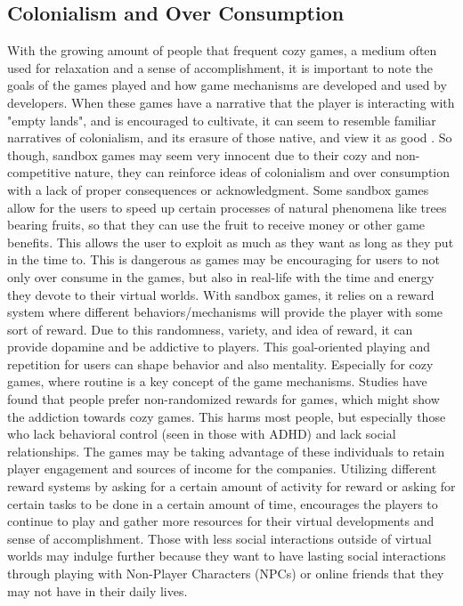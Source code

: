 \documentclass[10pt,twocolumn]{article}
\begin{document}
\subsection{Colonialism and Over Consumption}
With the growing amount of people that frequent cozy games, a medium often used for relaxation and a sense of accomplishment, it is important to note the goals of the games played and how game mechanisms are developed and used by developers. When these games have a narrative that the player is interacting with "empty lands", and is encouraged to cultivate, it can seem to resemble familiar narratives of colonialism, and its erasure of those native, and view it as good \cite{USA_Smith_2022}. So though, sandbox games may seem very innocent due to their cozy and non-competitive nature, they can reinforce ideas of colonialism and over consumption with a lack of proper consequences or acknowledgment. Some sandbox games allow for the users to speed up certain processes of natural phenomena like trees bearing fruits, so that they can use the fruit to receive money or other game benefits. This allows the user to exploit as much as they want as long as they put in the time to. This is dangerous as games may be encouraging for users to not only over consume in the games, but also in real-life with the time and energy they devote to their virtual worlds. With sandbox games, it relies on a reward system where different behaviors/mechanisms will provide the player with some sort of reward. Due to this randomness, variety, and idea of reward, it can provide dopamine and be addictive to players\cite{Staewen_Trevino_Chang_Yun_2014}. This goal-oriented playing and repetition for users can shape behavior and also mentality. Especially for cozy games, where routine is a key concept of the game mechanisms. Studies have found that people prefer non-randomized rewards for games, which might show the addiction towards cozy games.\cite{Staewen_Trevino_Chang_Yun_2014} This harms most people, but especially those who lack behavioral control (seen in those with ADHD) and lack social relationships\cite{Eijnden_Peeters_2024}. The games may be taking advantage of these individuals to retain player engagement and sources of income for the companies. Utilizing different reward systems by asking for a certain amount of activity for reward or asking for certain tasks to be done in a certain amount of time, encourages the players to continue to play and gather more resources for their virtual developments and sense of accomplishment. Those with less social interactions outside of virtual worlds may indulge further because they want to have lasting social interactions through playing with Non-Player Characters (NPCs) or online friends that they may not have in their daily lives.\cite{Eijnden_Peeters_2024}
\end{document}
